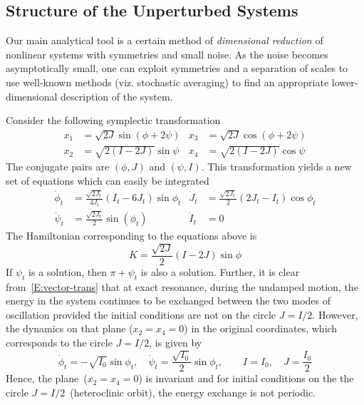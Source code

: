 \subsection{Structure of the Unperturbed Systems}
\label{S:Unperturbed}

Our main analytical tool is a certain method of \emph{dimensional reduction} of nonlinear systems with symmetries and small noise. As the noise becomes asymptotically small, one can exploit symmetries and a separation of scales to use well-known methods (viz. stochastic averaging) to find an appropriate lower-dimensional description of the system.

Consider the following symplectic transformation
\begin{align*}
x_1 &= \sqrt{2 J}\sin(\phi + 2 \psi) & x_3 &= \sqrt{2 J} \cos(\phi + 2 \psi)\\
x_2 &= \sqrt {2 (I - 2 J)}\sin \psi & x_4 &= \sqrt{2(I - 2J)} \cos \psi
\end{align*}
The conjugate pairs are $(\phi,J)$ and $(\psi,I)$. This transformation yields a new set of equations which can easily be integrated
\begin{equation}
\label{E:vector-trans}
\begin{aligned}
\dot \phi_t &= \frac{\sqrt{2J_t}}{4J_t} (I_t - 6 J_t) \sin \phi_t & \dot J_t &= \frac{\sqrt{2 J_t}}{2} (2 J_t - I_t) \cos \phi_t\\
\dot \psi_t &= \frac{\sqrt{2 J_t}}{2} \sin(\phi_t) & \dot I_t &= 0
\end{aligned}
\end{equation}
The Hamiltonian corresponding to the equations above is
\[
K = \frac{\sqrt{2 J}}{2} (I-2 J)\sin \phi
\]
If $\psi_t$ is a solution, then $\pi + \psi_t$ is also a solution. Further, it is clear from~\eqref{E:vector-trans} that at exact resonance, during the undamped motion, the energy in the system continues to be exchanged between the two modes of oscillation provided the initial conditions are not on the circle $J = I/2$. However, the dynamics on that plane ($x_2=x_4=0$) in the original coordinates, which corresponds to the circle $J=I/2$, is given by
\[
\dot \phi_t = - \sqrt{I_0} \sin \phi_t, \quad \dot \psi_t =
\frac{\sqrt{I_0}}{2} \sin \phi_t,
\qquad I=I_0, \quad J= \frac{I_0}{2}
\]
Hence, the plane~($x_2=x_4=0$) is invariant and for initial conditions on the the circle $J=I/2$~(heteroclinic orbit), the energy exchange is not periodic.

